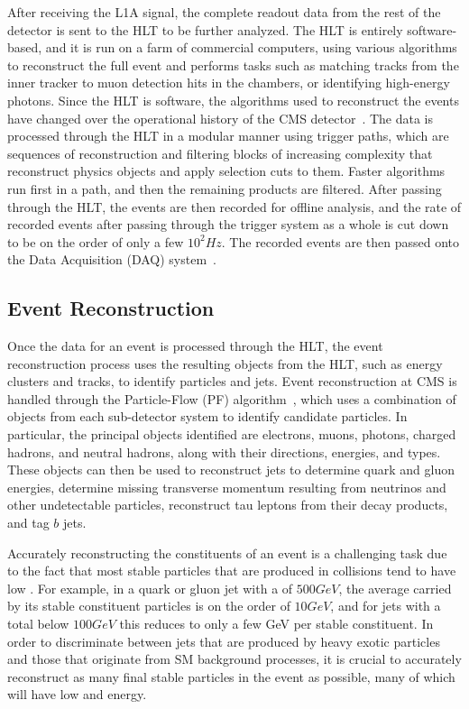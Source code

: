 After receiving the L1A signal, the complete readout data from the rest of the detector is sent to the HLT to be further analyzed.
The HLT is entirely software-based, and it is run on a farm of commercial computers, using various algorithms to reconstruct the full event and performs tasks such as matching tracks from the inner tracker to muon detection hits in the chambers, or identifying high-energy photons.
Since the HLT is software, the algorithms used to reconstruct the events have changed over the operational history of the CMS detector~\cite{Trocino_2014}.
The data is processed through the HLT in a modular manner using trigger paths, which are sequences of reconstruction and filtering blocks of increasing complexity that reconstruct physics objects and apply selection cuts to them.
Faster algorithms run first in a path, and then the remaining products are filtered.
After passing through the HLT, the events are then recorded for offline analysis, and the rate of recorded events after passing through the trigger system as a whole is cut down to be on the order of only a few $10^2\unit{Hz}$.
The recorded events are then passed onto the Data Acquisition (DAQ) system~\cite{Cittolin:578006}.

\subsection{Event Reconstruction}

Once the data for an event is processed through the HLT, the event reconstruction process uses the resulting objects from the HLT, such as energy clusters and tracks, to identify particles and jets.
Event reconstruction at CMS is handled through the Particle-Flow (PF) algorithm~\cite{CMS-PAS-PFT-09-001,CMS-PAS-PFT-10-001}, which uses a combination of objects from each sub-detector system to identify candidate particles.
In particular, the principal objects identified are electrons, muons, photons, charged hadrons, and neutral hadrons, along with their directions, energies, and types.
These objects can then be used to reconstruct jets to determine quark and gluon energies, determine missing transverse momentum \ptmiss resulting from neutrinos and other undetectable particles, reconstruct tau leptons from their decay products, and tag $b$ jets.

Accurately reconstructing the constituents of an event is a challenging task due to the fact that most stable particles that are produced in collisions tend to have low \pt.
For example, in a quark or gluon jet with a \pt of $500\unit{GeV}$, the average \pt carried by its stable constituent particles is on the order of $10\unit{GeV}$, and for jets with a total \pt below $100\unit{GeV}$ this reduces to only a few GeV per stable constituent.
In order to discriminate between jets that are produced by heavy exotic particles and those that originate from SM background processes, it is crucial to accurately reconstruct as many final stable particles in the event as possible, many of which will have low \pt and energy.

